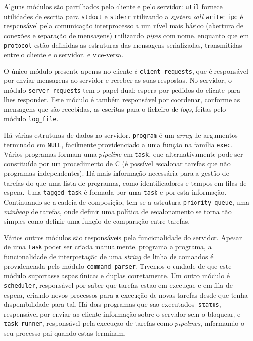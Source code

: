 \documentclass[11pt]{article}
\begin{document}
Alguns módulos são partilhados pelo cliente e pelo servidor: \texttt{util} fornece utilidades de
escrita para \texttt{stdout} e \texttt{stderr} utilizando a \emph{system call} \texttt{write};
\texttt{ipc} é responsável pela comunicação interprocesso a um nível mais básico (abertura de
conexões e separação de mensagens) utilizando \emph{pipes} com nome, enquanto que em
\texttt{protocol} estão definidas as estruturas das mensagens serializadas, transmitidas entre o
cliente e o servidor, e vice-versa.

O único módulo presente apenas no cliente é \texttt{client\_requests}, que é responsável por enviar
mensagens ao servidor e receber as suas respostas. No servidor, o módulo \texttt{server\_requests}
tem o papel dual: espera por pedidos do cliente para lhes responder. Este módulo é também
responsável por coordenar, conforme as mensagens que são recebidas, as escritas para o ficheiro de
\emph{logs}, feitas pelo módulo \texttt{log\_file}.

Há várias estruturas de dados no servidor. \texttt{program} é um \emph{array} de argumentos
terminado em \texttt{NULL}, facilmente providenciado a uma função na família \texttt{exec}. Vários
programas formam uma \emph{pipeline} em \texttt{task}, que alternativamente pode ser constituída por
um procedimento de C (é possível escalonar tarefas que não programas independentes). Há mais
informação necessária para a gestão de tarefas do que uma lista de programas, como identificadores e
tempos em filas de espera. Uma \texttt{tagged\_task} é formada por uma \texttt{task} e por esta
informação. Continuando-se a cadeia de composição, tem-se a estrutura \texttt{priority\_queue}, uma
\emph{minheap} de tarefas, onde definir uma política de escalonamento se torna tão simples como
definir uma função de comparação entre tarefas.

Vários outros módulos são responsáveis pela funcionalidade do servidor. Apesar de uma \texttt{task}
poder ser criada manualmente, programa a programa, a funcionalidade de interpretação de uma
\emph{string} de linha de comandos é providenciada pelo módulo \texttt{command\_parser}. Tivemos o
cuidado de que este módulo suportasse aspas únicas e duplas corretamente. Um outro módulo é
\texttt{scheduler}, responsável por saber que tarefas estão em execução e em fila de espera, criando
novos processos para a execução de novas tarefas desde que tenha disponibilidade para tal. Há dois
programas que são executados, \texttt{status}, responsável por enviar ao cliente informação sobre o
servidor sem o bloquear, e \texttt{task\_runner}, responsável pela execução de tarefas como
\emph{pipelines}, informando o seu processo pai quando estas terminam.
\end{document}
